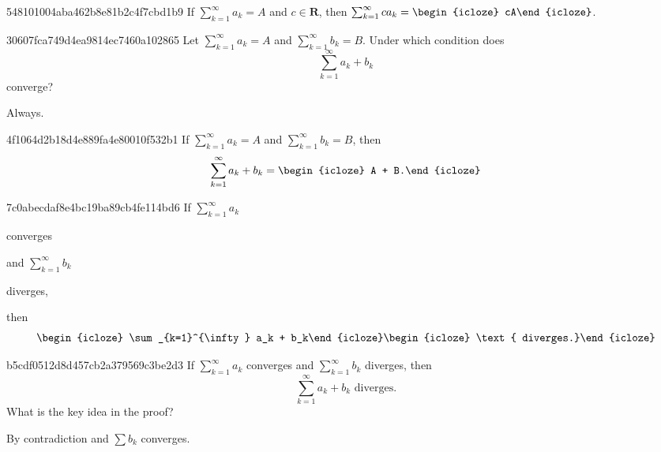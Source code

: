 \begin{note}{548101004aba462b8e81b2c4f7cbd1b9}
    If \({ \sum_{k=1}^{\infty} a_k = A }\) and \({ c \in \mathbf{R} }\), then \({ \sum_{k=1}^{\infty} ca_k = \begin{icloze}{1}cA\end{icloze} }\).
\end{note}

\begin{note}{30607fca749d4ea9814ec7460a102865}
    Let \({ \sum_{k=1}^{\infty} a_k = A }\) and \({ \sum_{k=1}^{\infty} b_k = B }\).
    Under which condition does
    \[
        \sum_{k=1}^{\infty} a_k + b_k
    \]
    converge?

    \begin{cloze}{1}
        Always.
    \end{cloze}
\end{note}

\begin{note}{4f1064d2b18d4e889fa4e80010f532b1}
    If \({ \sum_{k=1}^{\infty} a_k = A }\) and \({ \sum_{k=1}^{\infty} b_k = B }\), then
    \[
        \sum_{k=1}^{\infty} a_k + b_k = \begin{icloze}{1}A + B.\end{icloze}
    \]
\end{note}

\begin{note}{7c0abecdaf8e4bc19ba89cb4fe114bd6}
    If \({ \sum_{k=1}^{\infty} a_k }\) \begin{icloze}{3}converges\end{icloze} and \({ \sum_{k=1}^{\infty} b_k }\) \begin{icloze}{3}diverges,\end{icloze} then
    \[
        \begin{icloze}{2}\sum_{k=1}^{\infty} a_k + b_k\end{icloze} \begin{icloze}{1}\text{ diverges.}\end{icloze}
    \]
\end{note}

\begin{note}{b5cdf0512d8d457cb2a379569c3be2d3}
    If \({ \sum_{k=1}^{\infty} a_k }\) converges and \({ \sum_{k=1}^{\infty} b_k }\) diverges, then
    \[
        \sum_{k=1}^{\infty} a_k + b_k \text{ diverges.}
    \]
    What is the key idea in the proof?

    \begin{cloze}{1}
        By contradiction and \({ \sum b_k }\) converges.
    \end{cloze}
\end{note}

